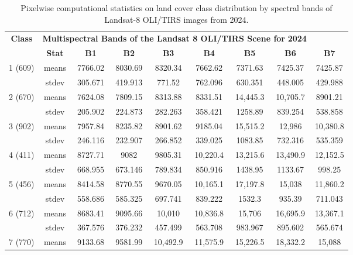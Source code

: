 \documentclass[jmse,article,accept,pdftex,oneauthor]{Definitions/mdpi}
\begin{document}
\vspace{-12pt}
\begin{table}[H]
  \caption{Pixelwise computational statistics on land cover class distribution by spectral bands of Landsat-8 OLI/TIRS images from 2024. \label{tab06}}
 \setlength{\tabcolsep}{1.73mm}
   \begin{tabular}{ccccccccc}
  \toprule
  \multirow{2}{*}{\textbf{Class}} & \multicolumn{7}{c}{\textbf{Multispectral Bands of the Landsat 8 OLI/TIRS Scene for} \textbf{2024}} \\
    & \textbf{Stat }& \textbf{B1} & \textbf{B2} & \textbf{B3} & \textbf{B4} & \textbf{B5} & \textbf{B6} & \textbf{B7} \\
    \midrule
    \multirow{2}{*}{1 (609)} & means & 7766.02 & 8030.69 & 8320.34 & 7662.62 & 7371.63 & 7425.37 & 7425.87 \\
    & stdev & 305.671 & 419.913 & 771.52 & 762.096 & 630.351 & 448.005 & 429.988 \\
    \midrule
    \multirow{2}{*}{2 (670)} & means & 7624.08 & 7809.15 & 8313.88 & 8331.51 & 14,445.3 & 10,705.7 & 8901.21 \\
    & stdev & 205.902 & 224.873 & 282.263 & 358.421 & 1258.89 & 839.254 & 538.858 \\
    \midrule
    \multirow{2}{*}{3 (902)} & means & 7957.84 & 8235.82 & 8901.62 & 9185.04 & 15,515.2 & 12,986 & 10,380.8 \\
    & stdev & 246.116 & 232.907 & 266.852 & 339.025 & 1083.85 & 732.316 & 535.359 \\
    \midrule
    \multirow{2}{*}{4 (411)} & means & 8727.71 & 9082 & 9805.31 & 10,220.4 & 13,215.6 & 13,490.9 & 12,152.5 \\
    & stdev & 668.955 & 673.146 & 789.834 & 850.916 & 1438.95 & 1133.67 & 998.25 \\
    \midrule
    \multirow{2}{*}{5 (456)} & means & 8414.58 & 8770.55 & 9670.05 & 10,165.1 & 17,197.8 & 15,038 & 11,860.2 \\
    & stdev & 558.686 & 585.325 & 697.741 & 839.222 &1532.3 & 935.39 & 711.043 \\
    \midrule
    \multirow{2}{*}{6 (712)} & means & 8683.41 & 9095.66 & 10,010 & 10,836.8 & 15,706 & 16,695.9 & 13,367.1 \\
    & stdev & 367.576 & 376.232 & 457.499 & 563.708 & 983.967 & 895.602 & 565.674 \\
    \midrule
    \multirow{2}{*}{7 (770)} & means & 9133.68 & 9581.99 & 10,492.9 & 11,575.9 & 15,226.5 & 18,332.2 & 15,088 \\

\end{tabular}
\end{table}
\end{document}
